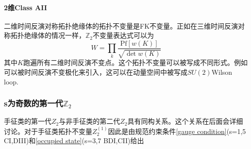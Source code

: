 \documentclass[a4paper]{article}
\numberwithin{equation}{subsection}
\begin{document}
\paragraph{2维Class AII}
二维时间反演对称拓扑绝缘体的拓扑不变量是FK不变量。正如在三维时间反演对称拓扑绝缘体的情况一样，$\mathbb{Z}_2$不变量表达式可以为
\begin{equation}
    W=\prod_{k}\frac{\mathrm{Pf}[w(K)]}{\sqrt{\det w(K)}}
\end{equation}
其中$K$跑遍所有二维时间反演不变点。这个拓扑不变量可以被写成不同形式。例如可以被时间反演不变极化来引入，这可以在动量空间中被写成$SU(2)$Wilson loop.
\subsubsection{s为奇数的第一代$\mathbb{Z}_2$}
手征类的第一代$Z_2$与非手征类的第二代$Z_2$具有同构关系。这个关系在后面会详细讨论。对于手征类拓扑不变量$Z_2^{(1)}$因此是由规范约束条件\eqref{gauge condition}(s=1,5 CI,DIII)和\eqref{occupied state}(s=3,7 BDI,CII)给出
\end{document}
